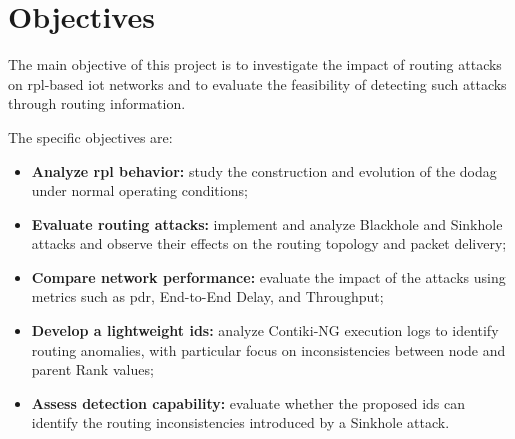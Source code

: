 \section{Objectives}
\label{sec:objectives}
The main objective of this project is to investigate the impact of routing attacks on \gls{rpl}-based \gls{iot} networks and to evaluate the feasibility of detecting such attacks through routing information.

The specific objectives are:
\begin{itemize}
    \item \textbf{Analyze \gls{rpl} behavior:} study the construction and evolution of the \gls{dodag} under normal operating conditions;
    \item \textbf{Evaluate routing attacks:} implement and analyze Blackhole and Sinkhole attacks and observe their effects on the routing topology and packet delivery;
    \item \textbf{Compare network performance:} evaluate the impact of the attacks using metrics such as \gls{pdr}, End-to-End Delay, and Throughput;
    \item \textbf{Develop a lightweight \gls{ids}:} analyze Contiki-NG execution logs to identify routing anomalies, with particular focus on inconsistencies between node and parent Rank values;
    \item \textbf{Assess detection capability:} evaluate whether the proposed \gls{ids} can identify the routing inconsistencies introduced by a Sinkhole attack.
\end{itemize}